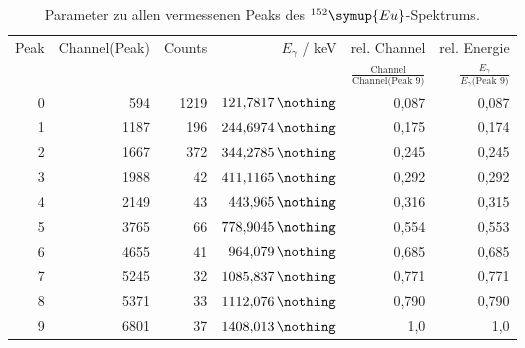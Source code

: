 \begin{table}[h!]
  \centering
  \caption{Parameter zu allen vermessenen Peaks des $^{152}\symup{Eu}$-Spektrums.}
  \label{tab:eu_peaks}
  \begin{tabular}{ r  r  r  r  r  r  }
    \bottomrule
            Peak & Channel(Peak)  & Counts  &  $E_{\gamma}$ / keV \cite{nucleide} & rel. Channel                                       & rel. Energie  \\ %
                 &                &         &                                     & $\frac{\text{Channel}}{\text{Channel(Peak 9)}}$    & $\frac{E_{\gamma}}{E_{\gamma}\text{(Peak 9)}}$ \\ %
    \midrule
            0    &  594           &  1219   &  $\SI{121.7817}{\nothing}$          & 0,087                                              & 0,087 \\
            1    &  1187          &  196    &  $\SI{244.6974}{\nothing}$          & 0,175                                              & 0,174 \\
            2    &  1667          &  372    &  $\SI{344.2785}{\nothing}$          & 0,245                                              & 0,245 \\
            3    &  1988          &  42     &  $\SI{411.1165}{\nothing}$          & 0,292                                              & 0,292 \\
            4    &  2149          &  43     &  $\SI{ 443.965}{\nothing}$          & 0,316                                              & 0,315 \\
            5    &  3765          &  66     &  $\SI{778.9045}{\nothing}$          & 0,554                                              & 0,553 \\
            6    &  4655          &  41     &  $\SI{ 964.079}{\nothing}$          & 0,685                                              & 0,685 \\
            7    &  5245          &  32     &  $\SI{1085.837}{\nothing}$          & 0,771                                              & 0,771 \\
            8    &  5371          &  33     &  $\SI{1112.076}{\nothing}$          & 0,790                                              & 0,790 \\
            9    &  6801          &  37     &  $\SI{1408.013}{\nothing}$          & 1,0                                                & 1,0 \\
    \toprule
  \end{tabular}
\end{table}
